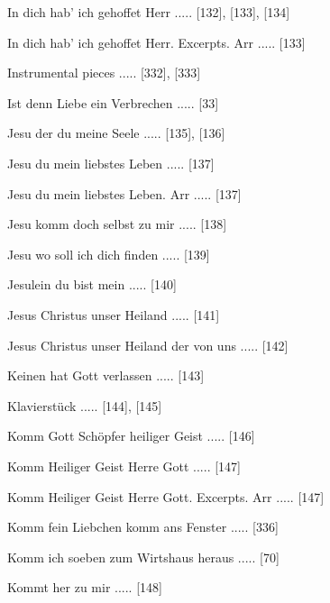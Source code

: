 \documentclass[twocolumn]{book}
\begin{document}
\newline 
In dich hab' ich gehoffet Herr ..... [132], [133], [134]

\newline 
In dich hab' ich gehoffet Herr. Excerpts. Arr ..... [133]

\newline 
Instrumental pieces ..... [332], [333]

\newline 
Ist denn Liebe ein Verbrechen ..... [33]

\newline 
Jesu der du meine Seele ..... [135], [136]

\newline 
Jesu du mein liebstes Leben ..... [137]

\newline 
Jesu du mein liebstes Leben. Arr ..... [137]

\newline 
Jesu komm doch selbst zu mir ..... [138]

\newline 
Jesu wo soll ich dich finden ..... [139]

\newline 
Jesulein du bist mein ..... [140]

\newline 
Jesus Christus unser Heiland ..... [141]

\newline 
Jesus Christus unser Heiland der von uns ..... [142]

\newline 
Keinen hat Gott verlassen ..... [143]

\newline 
Klavierstück ..... [144], [145]

\newline 
Komm Gott Schöpfer heiliger Geist ..... [146]

\newline 
Komm Heiliger Geist Herre Gott ..... [147]

\newline 
Komm Heiliger Geist Herre Gott. Excerpts. Arr ..... [147]

\newline 
Komm fein Liebchen komm ans Fenster ..... [336]

\newline 
Komm ich soeben zum Wirtshaus heraus ..... [70]

\newline 
Kommt her zu mir ..... [148]
\end{document}
